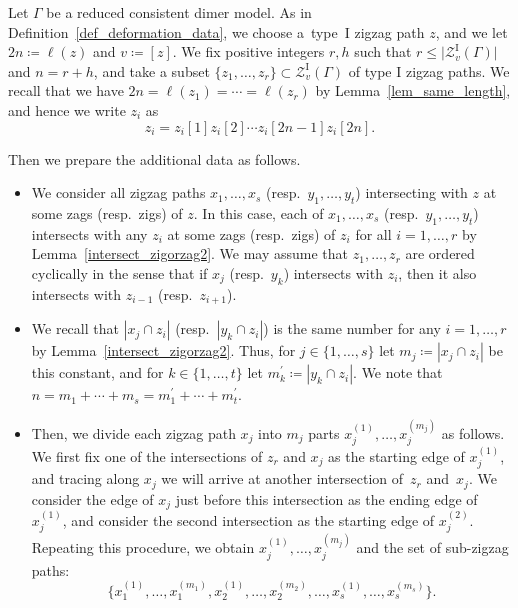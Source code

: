 \documentclass[pdftex]{sigma}%
\numberwithin{equation}{section}
\numberwithin{figure}{section}
\numberwithin{table}{section}
\newcommand{\rmI}{\mathrm{I}}
\newcommand{\calZ}{\mathcal{Z}}
\begin{document}
\begin{setting}\label{def_deformation_exdata}
Let $\Gamma$ be a reduced consistent dimer model.
As in Definition~\ref{def_deformation_data}, we choose a~type~I zigzag path $z$, and we let $2n\coloneqq\ell(z)$ and $v\coloneqq [z]$.
We fix positive integers $r, h$ such that $r\le \big|\calZ_v^\rmI(\Gamma)\big|$ and $n=r+h$,
and take a subset $\{z_1,\dots,z_r\}\subset\calZ_v^\rmI(\Gamma)$ of type I zigzag paths.
We recall that we have $2n=\ell(z_1)=\cdots=\ell(z_r)$ by Lemma~\ref{lem_same_length}, and hence we write $z_i$ as
\begin{displaymath}
z_i=z_i[1]z_i[2]\cdots z_i[2n-1]z_i[2n].
\end{displaymath}

Then we prepare the additional data as follows.
\begin{itemize}\itemsep=0pt
\item[(1)] We consider all zigzag paths $x_1,\dots, x_s$ (resp.~$y_1,\dots, y_t$) intersecting with $z$ at some zags (resp.\ zigs) of $z$.
In this case, each of $x_1,\dots, x_s$ (resp.\ $y_1,\dots, y_t$) intersects with any $z_i$ at some zags (resp.\ zigs) of $z_i$ for all $i=1,\dots,r$ by Lemma~\ref{intersect_zigorzag2}.
We may assume that $z_1,\dots,z_r$ are ordered cyclically in the sense that if $x_j$ (resp.~$y_k$) intersects with $z_i$,
then it also intersects with $z_{i-1}$ (resp.~$z_{i+1}$).
\item[(2)]
We recall that $|x_j\cap z_i|$ (resp.~$|y_k\cap z_i|$) is the same number for any $i=1,\dots,r$ by Lemma~\ref{intersect_zigorzag2}.
Thus, for $j\in\{1,\dots, s\}$ let $m_j\coloneqq|x_j\cap z_i|$ be this constant, and for $k\in\{1,\dots, t\}$ let $m^\prime_k\coloneqq|y_k\cap z_i|$.
We note that $n=m_1+\cdots+m_s=m^\prime_1+\cdots+m^\prime_t$.
\item[(3)] Then, we divide each zigzag path $x_j$ into $m_j$ parts $x_j^{(1)},\dots,x_j^{(m_j)}$ as follows.
We first fix one of the intersections of $z_r$ and $x_j$ as the starting edge of $x_j^{(1)}$,
and tracing along $x_j$ we will arrive at another intersection of~$z_r$ and~$x_j$.
We consider the edge of $x_j$ just before this intersection as the ending edge of $x_j^{(1)}$, and consider the second intersection as the starting edge of $x_j^{(2)}$.
Repeating this procedure, we obtain $x_j^{(1)},\dots,x_j^{(m_j)}$ and the set of sub-zigzag paths:
\begin{equation}\label{subzigzag_x}
\big\{x_1^{(1)},\dots,x_1^{(m_1)}, x_2^{(1)},\dots,x_2^{(m_2)}, \dots, x_s^{(1)},\dots,x_s^{(m_s)}\big\}.
\end{equation}


\end{itemize}
\end{setting}
\end{document}
